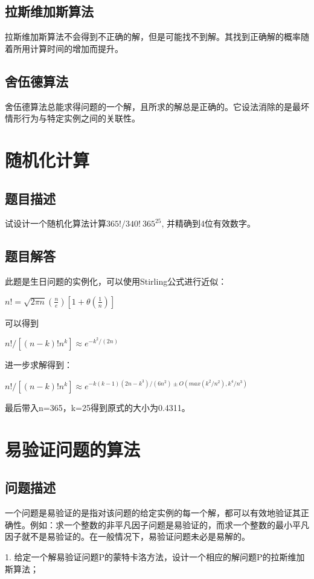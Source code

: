 \documentclass[UTF8]{ctexart}
\begin{document}
    \subsection{拉斯维加斯算法}
    拉斯维加斯算法不会得到不正确的解，但是可能找不到解。其找到正确解的概率随着所用计算时间的增加而提升。
    \subsection{舍伍德算法}
    舍伍德算法总能求得问题的一个解，且所求的解总是正确的。它设法消除的是最坏情形行为与特定实例之间的关联性。
    \section{随机化计算}
    \subsection{题目描述}
    试设计一个随机化算法计算$365!/340!\ 365^{25}$, 并精确到4位有效数字。
    \subsection{题目解答}
    此题是生日问题的实例化，可以使用Stirling公式进行近似：
    
    $n!=\sqrt{2\pi n} (\frac{n}{e}) [1 + \theta(\frac{1}{n})]$
    
    可以得到
    
    $n!/[(n-k)!n^k]\approx e^{-k^2/(2n)}$
    
    进一步求解得到：
    
    $n!/[(n-k)!n^k]\approx e^{-k(k-1)(2n-k^3)/(6n^2)\pm O(max(k^2/n^2), k^4/n^3)}$
    
    最后带入n=365，k=25得到原式的大小为0.4311。
    
    \section{易验证问题的算法}
    \subsection{问题描述}
    一个问题是易验证的是指对该问题的给定实例的每一个解，都可以有效地验证其正确性。例如：求一个整数的非平凡因子问题是易验证的，而求一个整数的最小平凡因子就不是易验证的。在一般情况下，易验证问题未必是易解的。

    1. 给定一个解易验证问题P的蒙特卡洛方法，设计一个相应的解问题P的拉斯维加斯算法；
\end{document}
